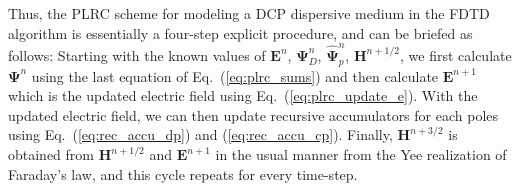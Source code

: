 Thus, the PLRC scheme for modeling a DCP dispersive medium in the FDTD algorithm is essentially a four-step explicit procedure, and can be briefed as follows: Starting with the known values of $\mathbf{E}^{n}$, $\mathbf{\Psi}_D^n$, $\hat{\mathbf\Psi}_p^n$, $\mathbf{H}^{n+1/2}$, we first calculate $\mathbf{\Psi}^n$ using the last equation of Eq.~(\ref{eq:plrc_sums}) and then calculate $\mathbf{E}^{n+1}$ which is the updated electric field using Eq.~(\ref{eq:plrc_update_e}). With the updated electric field, we can then update recursive accumulators for each poles using Eq.~(\ref{eq:rec_accu_dp}) and (\ref{eq:rec_accu_cp}). Finally, $\mathbf{H}^{n+3/2}$ is obtained from $\mathbf{H}^{n+1/2}$ and $\mathbf{E}^{n+1}$ in the usual manner from the Yee realization of Faraday's law, and this cycle repeats for every time-step.

